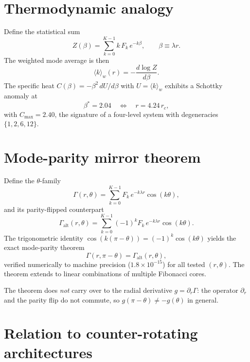 \documentclass[twocolumn,aps,prfluids]{revtex4-2}
\newcommand{\Gam}{\Gamma}
\begin{document}
\section{Thermodynamic analogy}
\label{sec:thermo}

Define the statistical sum
\begin{equation}
Z(\beta) = \sum_{k=0}^{K-1} k\,F_k \,e^{-k\beta},
\qquad \beta \equiv \lambda r.
\end{equation}
The weighted mode average is then
\begin{equation}
\langle k\rangle_w(r) = -\frac{d\log Z}{d\beta}.
\end{equation}
The specific heat $C(\beta) = -\beta^2\,dU/d\beta$ with $U=\langle k\rangle_w$
exhibits a Schottky anomaly at
\begin{equation}
\beta^* = 2.04 \quad\Longleftrightarrow\quad r = 4.24\,r_c,
\end{equation}
with $C_{\max} = 2.40$, the signature of a four-level system with
degeneracies $\{1,2,6,12\}$.

\section{Mode-parity mirror theorem}
\label{sec:mirror}

Define the $\theta$-family
\begin{equation}
\Gam(r,\theta) = \sum_{k=0}^{K-1} F_k \,e^{-k\lambda r}\cos(k\theta),
\end{equation}
and its parity-flipped counterpart
\begin{equation}
\Gam_{\text{alt}}(r,\theta) = \sum_{k=0}^{K-1} (-1)^k F_k \,e^{-k\lambda r}\cos(k\theta).
\end{equation}
The trigonometric identity $\cos(k(\pi-\theta)) = (-1)^k\cos(k\theta)$
yields the exact mode-parity theorem
\begin{equation}
\boxed{\Gam(r,\pi-\theta) = \Gam_{\text{alt}}(r,\theta),}
\label{eq:mirror}
\end{equation}
verified numerically to machine precision ($1.8\times10^{-15}$) for all
tested $(r,\theta)$. The theorem extends to linear combinations of
multiple Fibonacci cores.

The theorem does \emph{not} carry over to the radial derivative
$g = \partial_r\Gam$: the operator $\partial_r$ and the parity flip do
not commute, so $g(\pi-\theta) \neq -g(\theta)$ in general.

\section{Relation to counter-rotating architectures}
\label{sec:merkaba}
\end{document}
